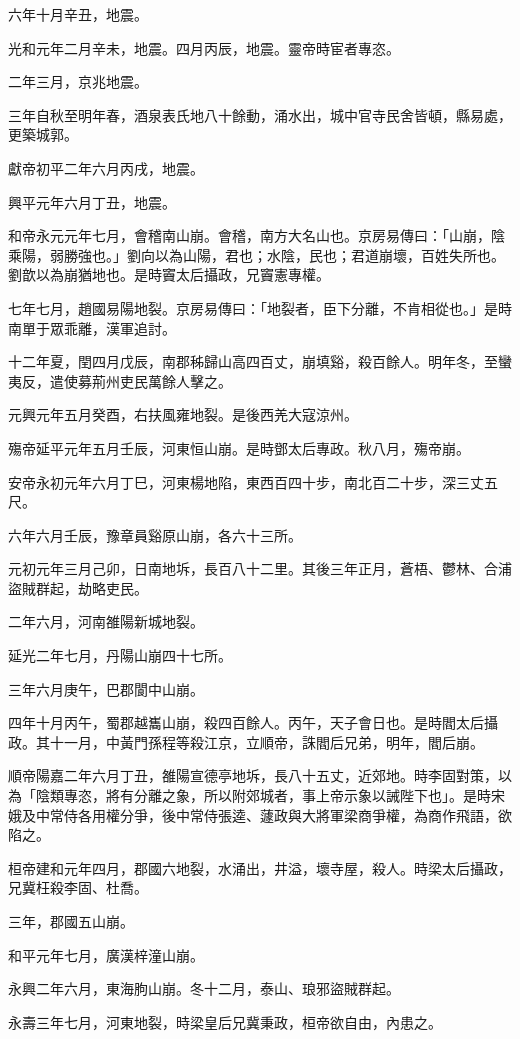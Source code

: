 \begin{pinyinscope}
六年十月辛丑，地震。

光和元年二月辛未，地震。四月丙辰，地震。靈帝時宦者專恣。

二年三月，京兆地震。

三年自秋至明年春，酒泉表氏地八十餘動，涌水出，城中官寺民舍皆頓，縣易處，更築城郭。

獻帝初平二年六月丙戌，地震。

興平元年六月丁丑，地震。

和帝永元元年七月，會稽南山崩。會稽，南方大名山也。京房易傳曰：「山崩，陰乘陽，弱勝強也。」劉向以為山陽，君也；水陰，民也；君道崩壞，百姓失所也。劉歆以為崩猶地也。是時竇太后攝政，兄竇憲專權。

七年七月，趙國易陽地裂。京房易傳曰：「地裂者，臣下分離，不肯相從也。」是時南單于眾乖離，漢軍追討。

十二年夏，閏四月戊辰，南郡秭歸山高四百丈，崩填谿，殺百餘人。明年冬，至蠻夷反，遣使募荊州吏民萬餘人擊之。

元興元年五月癸酉，右扶風雍地裂。是後西羌大寇涼州。

殤帝延平元年五月壬辰，河東恒山崩。是時鄧太后專政。秋八月，殤帝崩。

安帝永初元年六月丁巳，河東楊地陷，東西百四十步，南北百二十步，深三丈五尺。

六年六月壬辰，豫章員谿原山崩，各六十三所。

元初元年三月己卯，日南地坼，長百八十二里。其後三年正月，蒼梧、鬱林、合浦盜賊群起，劫略吏民。

二年六月，河南雒陽新城地裂。

延光二年七月，丹陽山崩四十七所。

三年六月庚午，巴郡閬中山崩。

四年十月丙午，蜀郡越巂山崩，殺四百餘人。丙午，天子會日也。是時閻太后攝政。其十一月，中黃門孫程等殺江京，立順帝，誅閻后兄弟，明年，閻后崩。

順帝陽嘉二年六月丁丑，雒陽宣德亭地坼，長八十五丈，近郊地。時李固對策，以為「陰類專恣，將有分離之象，所以附郊城者，事上帝示象以誡陛下也」。是時宋娥及中常侍各用權分爭，後中常侍張逵、蘧政與大將軍梁商爭權，為商作飛語，欲陷之。

桓帝建和元年四月，郡國六地裂，水涌出，井溢，壞寺屋，殺人。時梁太后攝政，兄冀枉殺李固、杜喬。

三年，郡國五山崩。

和平元年七月，廣漢梓潼山崩。

永興二年六月，東海朐山崩。冬十二月，泰山、琅邪盜賊群起。

永壽三年七月，河東地裂，時梁皇后兄冀秉政，桓帝欲自由，內患之。


\end{pinyinscope}
